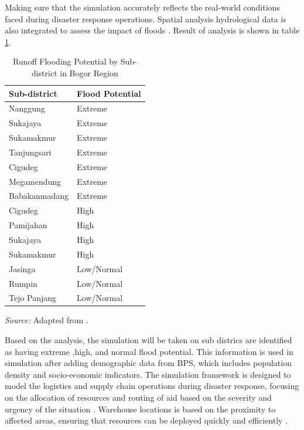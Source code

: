 \documentclass[journal,final,a4paper,twoside,11pt]{IEEEtran}
\begin{document}
Making sure that the simulation accurately reflects the real-world conditions faced during disaster response operations. Spatial analysis hydrological data is also integrated to assess the impact of floods \cite{alkaesi2021spatial}. Result of analysis is shown in table \ref{tab:analysis}.
\begin{table}[htbp]
\caption{Runoff Flooding Potential by Sub-district in Bogor Region}
\begin{center}
\begin{tabular}{|m{2.5cm}|m{2cm}|}
\hline
\textbf{Sub-district} & \textbf{Flood Potential} \\
\hline
Nanggung & Extreme \\
\hline Sukajaya & Extreme  \\
\hline Sukamakmur & Extreme \\
\hline Tanjungsari & Extreme \\
\hline Cigudeg & Extreme  \\
\hline Megamendung & Extreme  \\
\hline Babakanmadang & Extreme  \\
\hline
Cigudeg & High \\
\hline Pamijahan & High  \\
\hline Sukajaya & High  \\
\hline Sukamakmur & High\\
\hline
Jasinga & Low/Normal  \\
\hline Rumpin & Low/Normal  \\
\hline Tejo Panjang & Low/Normal  \\
\hline
\end{tabular}
\vspace{0.2cm}

\footnotesize{\textit{Source:} Adapted from \cite{alkaesi2021spatial}.}
\label{tab:analysis}
\end{center}
\end{table}

Based on the analysis, the simulation will be taken on sub districs are identified as having extreme ,high, and normal flood potential. This information is used in simulation after adding demographic data from BPS, which includes population density and socio-economic indicators. The simulation framework is designed to model the logistics and supply chain operations during disaster response, focusing on the allocation of resources and routing of aid based on the severity and urgency of the situation \cite{park2021architectural}. Warehouse locations is based on the proximity to affected areas, ensuring that resources can be deployed quickly and efficiently \cite{halawa2020introduction}.  
\end{document}
